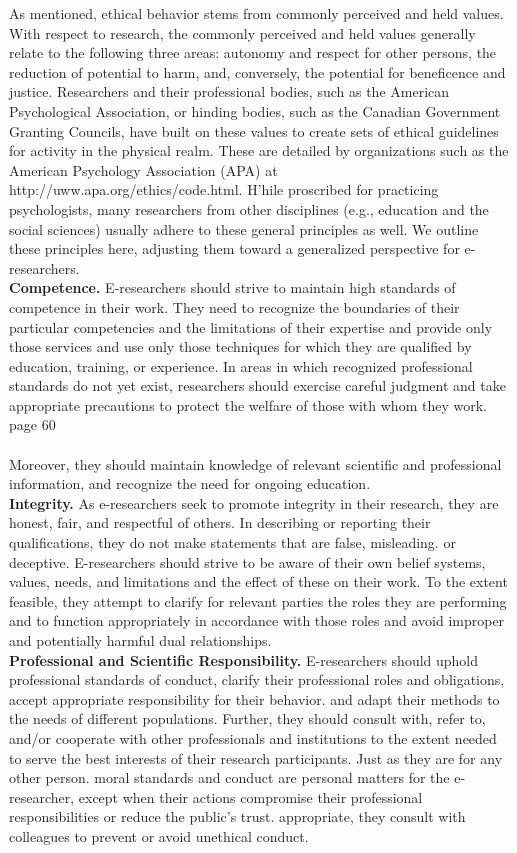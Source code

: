 \documentclass{book}
\begin{document}
As mentioned, ethical behavior stems from commonly perceived and held values. With respect to research, the commonly perceived and held values generally relate to the following three areas: autonomy and respect for other persons, the reduction of potential to harm, and, conversely, the potential for beneficence and justice. Researchers and their professional bodies, such as the American Psychological Association, or hinding bodies, such as the Canadian Government Granting Councils, have built on these values to create sets of ethical guidelines for activity in the physical realm. These are detailed by organizations such as the American Psychology Association (APA) at http://uww.apa.org/ethics/code.html. H'hile proscribed for practicing psychologists, many researchers from other disciplines (e.g., education and the social sciences) usually adhere to these general principles as well. We outline these principles here, adjusting them toward a generalized perspective for e-researchers.\\
\textbf{Competence.}  E-researchers should strive to maintain high standards of competence in their work. They need to recognize the boundaries of their particular competencies and the limitations of their expertise and provide only those services and use only those techniques for which they are qualified by education, training, or experience. In areas in which recognized professional standards do not yet exist, researchers should exercise careful judgment and take appropriate precautions to protect the welfare of those with whom they work. \newpage
page $60$\\\\
Moreover, they should maintain knowledge of relevant scientific and professional information, and recognize the need for ongoing education.\\
\textbf{Integrity.}  As e-researchers seek to promote integrity in their research, they are honest, fair, and respectful of others. In describing or reporting their qualifications, they do not make statements that are false, misleading. or deceptive. E-researchers should strive to be aware of their own belief systems, values, needs, and limitations and the effect of these on their work. To the extent feasible, they attempt to clarify for relevant parties the roles they are performing and to function appropriately in accordance with those roles and avoid improper and potentially harmful dual relationships.\\
\textbf{Professional and Scientific Responsibility.}  E-researchers should uphold professional standards of conduct, clarify their professional roles and obligations, accept appropriate responsibility for their behavior. and adapt their methods to the needs of different populations. Further, they should consult with, refer to, and/or cooperate with other professionals and institutions to the extent needed to serve the best interests of their research participants. Just as they are for any other person. moral standards and conduct are personal matters for the e-researcher, except when their actions compromise their professional responsibilities or reduce the public's trust. appropriate, they consult with colleagues to prevent or avoid unethical conduct.\\
\end{document}
